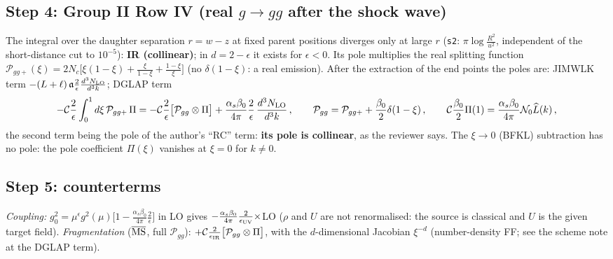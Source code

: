 {\subsection*{Step 4: Group II Row IV (real $g\to gg$ after the shock wave)}
\noindent The integral over the daughter separation $r=w-z$ at fixed parent positions diverges only at large $r$ (\texttt{s2}: $\pi\log\frac{R^{2}}{u^{2}}$, independent of the short-distance cut to $10^{-5}$): \textbf{IR (collinear)}; in $d=2-\epsilon$ it exists for $\epsilon<0$. Its pole multiplies the real splitting function $\mathcal{P}_{gg+}(\xi)=2N_{c}\big[\xi(1-\xi)+\frac{\xi}{1-\xi}+\frac{1-\xi}{\xi}\big]$ (no $\delta(1-\xi)$: a real emission). After the extraction of the end points the poles are: JIMWLK term $-(L+\ell)\,\mathfrak{a}\frac{2}{\epsilon}\frac{d^{3}N_{\rm LO}}{d^{3}k}$; DGLAP term
\begin{align}
-\mathcal{C}\frac{2}{\epsilon}\int_{0}^{1}d\xi\,\mathcal{P}_{gg+}\,\Pi=-\mathcal{C}\frac{2}{\epsilon}\big[\mathcal{P}_{gg}\otimes\Pi\big]+\frac{\alpha_{s}\beta_{0}}{4\pi}\frac{2}{\epsilon}\,\frac{d^{3}N_{\rm LO}}{d^{3}k}\,,\qquad\mathcal{P}_{gg}=\mathcal{P}_{gg+}+\frac{\beta_{0}}{2}\delta(1-\xi)\,,\qquad\mathcal{C}\frac{\beta_{0}}{2}\Pi(1)=\frac{\alpha_{s}\beta_{0}}{4\pi}\mathcal{N}_{0}\widehat{L}(k)\,,\label{eq:dv-IV}
\end{align}
the second term being the pole of the author's ``RC'' term: \textbf{its pole is collinear}, as the reviewer says. The $\xi\to0$ (BFKL) subtraction has no pole: the pole coefficient $\Pi(\xi)$ vanishes at $\xi=0$ for $k\neq0$.

\subsection*{Step 5: counterterms}
\noindent \emph{Coupling:} $g_{0}^{2}=\mu^{\epsilon}g^{2}(\mu)\big[1-\frac{\alpha_{s}\beta_{0}}{4\pi}\frac{2}{\epsilon}\big]$ in LO gives $-\frac{\alpha_{s}\beta_{0}}{4\pi}\frac{2}{\epsilon_{\rm UV}}\times$LO ($\rho$ and $U$ are not renormalised: the source is classical and $U$ is the given target field). \emph{Fragmentation} ($\overline{\rm MS}$, full $\mathcal{P}_{gg}$): $+\mathcal{C}\frac{2}{\epsilon_{\rm IR}}\big[\mathcal{P}_{gg}\otimes\Pi\big]$, with the $d$-dimensional Jacobian $\xi^{-d}$ (number-density FF; see the scheme note at the DGLAP term).

}
